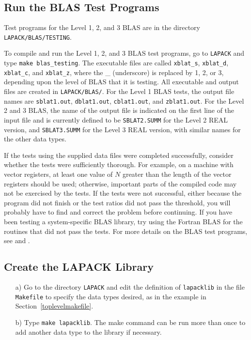 \documentclass[11pt]{report}
\begin{document}
\subsection{Run the BLAS Test Programs}\label{testblas}

Test programs for the Level 1, 2, and 3 BLAS are in the directory 
\texttt{LAPACK/BLAS/TESTING}.

To compile and run the Level 1, 2, and 3 BLAS test programs,
go to \texttt{LAPACK} and type \texttt{make blas\_testing}.  The executable
files are called \texttt{xblat\_s}, \texttt{xblat\_d}, \texttt{xblat\_c}, and
\texttt{xblat\_z}, where the \_ (underscore) is replaced by 1, 2, or 3,
depending upon the level of BLAS that it is testing.  All executable and
output files are created in \texttt{LAPACK/BLAS/}.
For the Level 1 BLAS tests, the output file names are \texttt{sblat1.out},
\texttt{dblat1.out}, \texttt{cblat1.out}, and \texttt{zblat1.out}.  For the Level
2 and 3 BLAS, the name of the output file is indicated on the first line of the
input file and is currently defined to be \texttt{SBLAT2.SUMM} for
the Level 2 REAL version, and \texttt{SBLAT3.SUMM} for the Level 3 REAL
version, with similar names for the other data types.

If the tests using the supplied data files were completed successfully,
consider whether the tests were sufficiently thorough.
For example, on a machine with vector registers, at least one value
of $N$ greater than the length of the vector registers should be used;
otherwise, important parts of the compiled code may not be
exercised by the tests. 
If the tests were not successful, either because the program did not
finish or the test ratios did not pass the threshold, you will
probably have to find and correct the problem before continuing. 
If you have been testing a system-specific
BLAS library, try using the Fortran BLAS for the routines that
did not pass the tests.
For more details on the BLAS test programs, 
see \cite{BLAS2-test} and \cite{BLAS3-test}.

\subsection{Create the LAPACK Library}

\begin{itemize}
\item[a)]
Go to the directory \texttt{LAPACK} and edit the definition of
\texttt{lapacklib} in the file \texttt{Makefile} to specify the data types desired,
as in the example in Section~\ref{toplevelmakefile}.

\item[b)]
Type \texttt{make lapacklib}.
The make command can be run more than once to add another
data type to the library if necessary.  

\end{itemize}
\end{document}
